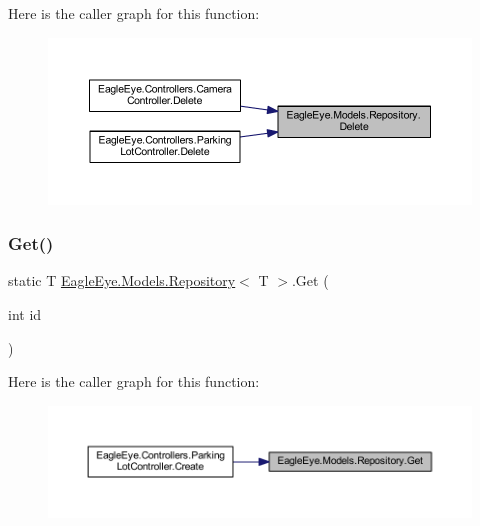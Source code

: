 Here is the caller graph for this function\+:\nopagebreak
\begin{figure}[H]
\begin{center}
\leavevmode
\includegraphics[width=350pt]{class_eagle_eye_1_1_models_1_1_repository_ad50f201c8f5f1c7794ddf068ed459854_icgraph}
\end{center}
\end{figure}
\mbox{\label{class_eagle_eye_1_1_models_1_1_repository_ac44cb18d8cbb605d3f7e14eb09c8c0bf}} 
\subsubsection{\texorpdfstring{Get()}{Get()}}
{\footnotesize\ttfamily static T \mbox{\hyperlink{class_eagle_eye_1_1_models_1_1_repository}{Eagle\+Eye.\+Models.\+Repository}}$<$ T $>$.Get (\begin{DoxyParamCaption}\item[{int}]{id }\end{DoxyParamCaption})\hspace{0.3cm}{\ttfamily [static]}}





Here is the caller graph for this function\+:\nopagebreak
\begin{figure}[H]
\begin{center}
\leavevmode
\includegraphics[width=350pt]{class_eagle_eye_1_1_models_1_1_repository_ac44cb18d8cbb605d3f7e14eb09c8c0bf_icgraph}
\end{center}
\end{figure}


